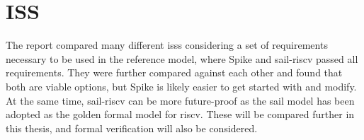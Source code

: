 \section{ISS}
\label{sec:pw_iss}

The report compared many different \acrshort{iss}s considering a set of requirements necessary to be used in the reference model, where Spike \cite{SpikeRISCVISA2023} and sail-riscv \cite{RISCVSailModel2023} passed all requirements. They were further compared against each other and found that both are viable options, but Spike is likely easier to get started with and modify. At the same time, sail-riscv can be more future-proof as the sail model has been adopted as the golden formal model for \acrshort{riscv}. These will be compared further in this thesis, and formal verification will also be considered.




